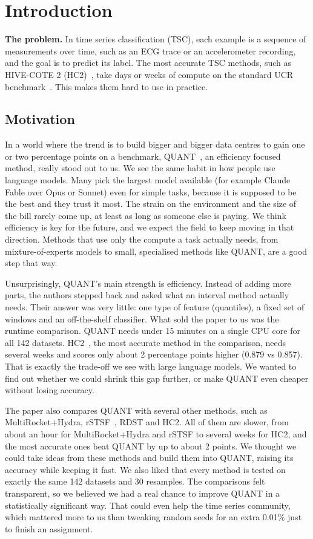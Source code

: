 \documentclass[conference]{IEEEtran}
\begin{document}
\section{Introduction}

\textbf{The problem.} In time series classification (TSC), each example is a sequence of measurements over time, such as an ECG trace or an accelerometer recording, and the goal is to predict its label. The most accurate TSC methods, such as HIVE-COTE 2 (HC2)~\cite{hc2}, take days or weeks of compute on the standard UCR benchmark~\cite{middlehurst2024bakeoff}. This makes them hard to use in practice.

\subsection{Motivation}
In a world where the trend is to build bigger and bigger data centres to gain one or two percentage points on a benchmark, QUANT~\cite{quant}, an efficiency focused method, really stood out to us. We see the same habit in how people use language models. Many pick the largest model available (for example Claude Fable over Opus or Sonnet) even for simple tasks, because it is supposed to be the best and they trust it most. The strain on the environment and the size of the bill rarely come up, at least as long as someone else is paying. We think efficiency is key for the future, and we expect the field to keep moving in that direction. Methods that use only the compute a task actually needs, from mixture-of-experts models to small, specialised methods like QUANT, are a good step that way.

Unsurprisingly, QUANT's main strength is efficiency. Instead of adding more parts, the authors stepped back and asked what an interval method actually needs. Their answer was very little: one type of feature (quantiles), a fixed set of windows and an off-the-shelf classifier. What sold the paper to us was the runtime comparison. QUANT needs under 15 minutes on a single CPU core for all 142 datasets. HC2~\cite{hc2}, the most accurate method in the comparison, needs several weeks and scores only about 2 percentage points higher (0.879 vs 0.857). That is exactly the trade-off we see with large language models. We wanted to find out whether we could shrink this gap further, or make QUANT even cheaper without losing accuracy.

The paper also compares QUANT with several other methods, such as MultiRocket+Hydra, rSTSF~\cite{rstsf}, RDST and HC2. All of them are slower, from about an hour for MultiRocket+Hydra and rSTSF to several weeks for HC2, and the most accurate ones beat QUANT by up to about 2 points. We thought we could take ideas from these methods and build them into QUANT, raising its accuracy while keeping it fast. We also liked that every method is tested on exactly the same 142 datasets and 30 resamples. The comparisons felt transparent, so we believed we had a real chance to improve QUANT in a statistically significant way. That could even help the time series community, which mattered more to us than tweaking random seeds for an extra 0.01\% just to finish an assignment.
\end{document}
